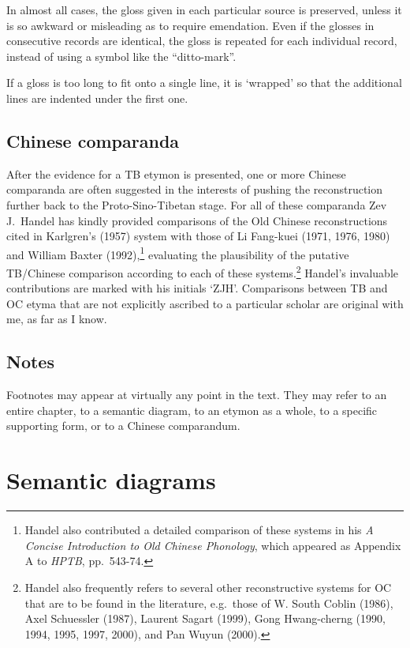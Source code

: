In almost all cases, the gloss given in each particular source is preserved,
unless it is so awkward or misleading as to require emendation.  Even if the
glosses in consecutive records are identical, the gloss is repeated for each
individual record, instead of using a symbol like the “ditto-mark”.  

If a gloss is too long to fit onto a single line, it is ‘wrapped’ so that
the additional lines are indented under the first one.


\subsection{Chinese comparanda}

After the evidence for a TB etymon is presented, one or more Chinese
comparanda are often suggested in the interests of pushing the reconstruction
further back to the Proto-Sino-Tibetan stage.  For all of these comparanda
Zev J.\ Handel has kindly provided comparisons of the Old Chinese reconstructions cited
in Karlgren’s (1957) system with those of Li Fang-kuei (1971, 1976, 1980) and
William Baxter (1992),\footnote{Handel also contributed a detailed comparison
of these systems in his \textit{A Concise Introduction to Old Chinese Phonology},
which appeared as Appendix A to \textit{HPTB}, pp.~543-74.}
evaluating the plausibility of the
putative TB/Chinese comparison according to each of these systems.\footnote{Handel  also frequently refers to several other reconstructive systems for OC that are to be found
in the literature, e.g.\ those of W. South Coblin (1986), Axel Schuessler (1987),
Laurent Sagart (1999), Gong Hwang-cherng (1990, 1994, 1995, 1997, 2000), and Pan
Wuyun (2000).}   Handel’s invaluable contributions are marked with his initials ‘ZJH’. 
Comparisons between TB and OC etyma that are not explicitly ascribed to a
particular scholar are original with me, as far as I know.

\subsection{Notes}

Footnotes may appear at virtually any point in the text. They may refer to an entire chapter, to a semantic diagram, to an etymon as a whole, to a specific supporting form, or to a Chinese comparandum.

\section{Semantic diagrams}
